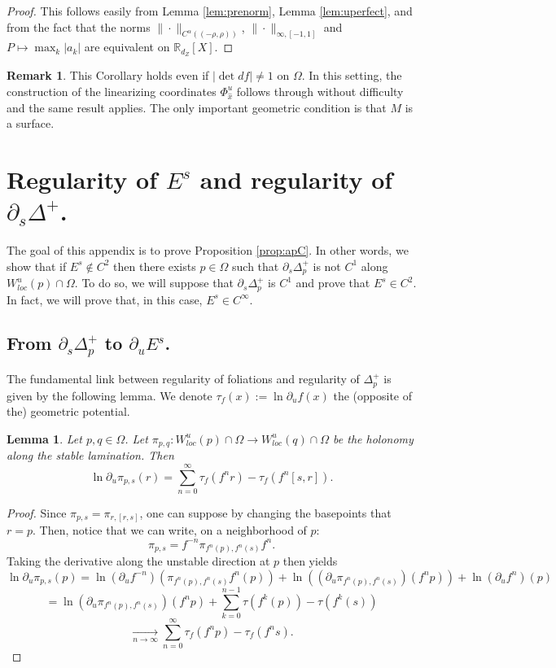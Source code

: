 \documentclass[a4paper]{article}
\newtheorem{lemma}[theorem]{Lemma}
\theoremstyle{definition}
\newtheorem{remark}[example]{Remark}
\begin{document}
\begin{proof}
This follows easily from Lemma \ref{lem:prenorm}, Lemma \ref{lem:uperfect}, and from the fact that the norms \newline
$\| \cdot \|_{C^\alpha((-\rho,\rho))}$, $\| \cdot \|_{\infty,[-1,1]}$ and $P \mapsto \max_k |a_k|$ are equivalent on $\mathbb{R}_{d_Z}[X]$.
\end{proof}

\begin{remark}
This Corollary holds even if $|\det df| \neq 1$ on $\Omega$. In this setting, the construction of the linearizing coordinates $\Phi_{\widehat{x}}^u$ follows through without difficulty and the same result applies. The only important geometric condition is that $M$ is a surface.
\end{remark}

\section{Regularity of $E^s$ and regularity of $\partial_s \Delta^+$.}\label{ap:C}

The goal of this appendix is to prove Proposition \ref{prop:apC}. In other words, we show that if $E^s \notin C^2$ then there exists $p \in \Omega$ such that $\partial_s \Delta^+_p$ is not $C^1$ along $W^u_{loc}(p) \cap \Omega$. To do so, we will suppose that $\partial_s \Delta^+_p$ is $C^1$ and prove that $E^s \in C^2$. In fact, we will prove that, in this case, $E^s \in C^\infty$. 

\subsection{From $\partial_s \Delta_p^+$ to $\partial_u E^s$.}

The fundamental link between regularity of foliations and regularity of $\Delta_p^+$ is given by the following lemma. We denote $\tau_f(x) := \ln \partial_u f(x)$ the (opposite of the) geometric potential.

\begin{lemma}\label{lem:disthol}
Let $p,q \in \Omega$. Let $\pi_{p,q}:W^u_{loc}(p) \cap \Omega \rightarrow W^u_{loc}(q) \cap \Omega $ be the holonomy along the stable lamination. Then
$$ \ln \partial_u \pi_{p,s}(r) = \sum_{n=0}^\infty \tau_f(f^n r) - \tau_f(f^n [s,r]). $$
\end{lemma}

\begin{proof}
Since $\pi_{p,s} = \pi_{r,[r,s]}$, one can suppose by changing the basepoints that $r=p$. Then, notice that we can write, on a neighborhood of $p$:
$$ \pi_{p,s} = f^{-n} \pi_{f^n(p),f^n(s)} f^{n}. $$
Taking the derivative along the unstable direction at $p$ then yields
$$ \ln \partial_u \pi_{p,s}(p) = \ln (\partial_u f^{-n})( \pi_{f^n(p),f^n(s)} f^{n}(p)) + \ln ((\partial_u \pi_{f^n(p),f^n(s)}) (f^{n}p )) + \ln (\partial_u f^n)(p) $$
$$ = \ln (\partial_u \pi_{f^n(p),f^n(s)}) (f^{n} p) + \sum_{k=0}^{n-1} \tau(f^k(p)) - \tau(f^k(s)) $$
$$ \underset{n \longrightarrow \infty}{\longrightarrow} \sum_{n=0}^\infty \tau_f(f^n p) - \tau_f(f^n s) .$$
\end{proof}
\end{document}
